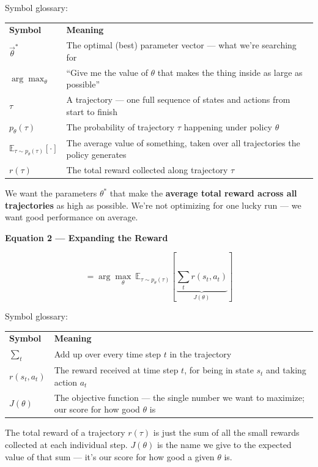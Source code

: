 Symbol glossary:

\begin{tabular}{ll}
\textbf{Symbol} & \textbf{Meaning} \\[4pt]
$\vec{\theta}^*$ & The optimal (best) parameter vector --- what we're searching for \\
$\arg\max_\theta$ & ``Give me the value of $\theta$ that makes the thing inside as large as possible'' \\
$\tau$ & A trajectory --- one full sequence of states and actions from start to finish \\
$p_\theta(\tau)$ & The probability of trajectory $\tau$ happening under policy $\theta$ \\
$\mathbb{E}_{\tau \sim p_\theta(\tau)}[\cdot]$ & The average value of something, taken over all trajectories the policy generates \\
$r(\tau)$ & The total reward collected along trajectory $\tau$ \\
\end{tabular}

\medskip

We want the parameters $\theta^*$ that make the \textbf{average total reward across all trajectories} as high as possible. We're not optimizing for one lucky run --- we want good performance on average.

\textbf{Equation 2 --- Expanding the Reward}

\[
= \arg\max_{\theta} \ \mathbb{E}_{\tau \sim p_\theta(\tau)} \left[ \underbrace{\sum_t r(s_t, a_t)}_{J(\theta)} \right]
\]

Symbol glossary:

\begin{tabular}{ll}
\textbf{Symbol} & \textbf{Meaning} \\[4pt]
$\sum_t$ & Add up over every time step $t$ in the trajectory \\
$r(s_t, a_t)$ & The reward received at time step $t$, for being in state $s_t$ and taking action $a_t$ \\
$J(\theta)$ & The objective function --- the single number we want to maximize; our score for how good $\theta$ is \\
\end{tabular}

\medskip

The total reward of a trajectory $r(\tau)$ is just the sum of all the small rewards collected at each individual step. $J(\theta)$ is the name we give to the expected value of that sum --- it's our score for how good a given $\theta$ is.


